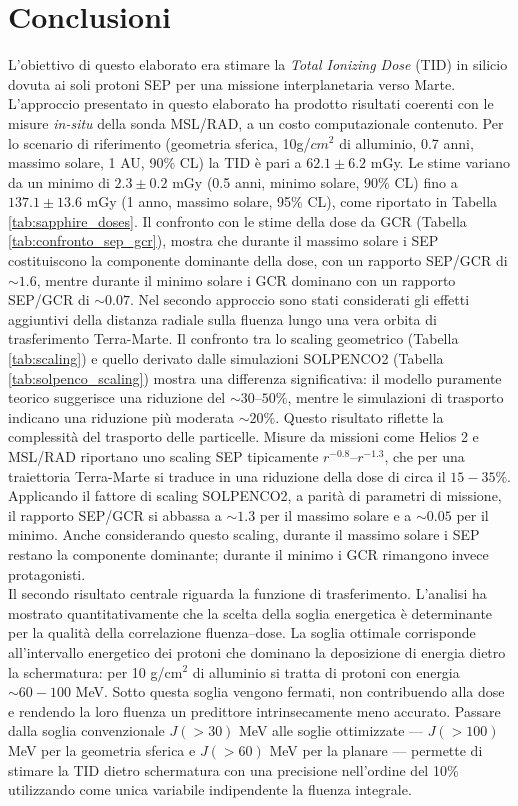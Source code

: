 \documentclass[12pt]{report}
\begin{document}
\chapter{Conclusioni}
\enlargethispage{3\baselineskip}
\vspace{-15pt}
L'obiettivo di questo elaborato era stimare la \textit{Total Ionizing Dose} (TID) in silicio dovuta ai soli protoni SEP per una missione interplanetaria verso Marte. L'approccio presentato in questo elaborato ha prodotto risultati coerenti con le misure \textit{in-situ} della sonda MSL/RAD, a un costo computazionale contenuto. Per lo scenario di riferimento (geometria sferica, 10g/$cm^2$ di alluminio, 0.7 anni, massimo solare, 1 AU, 90\% CL) la TID è pari a $62.1 \pm 6.2$ mGy. Le stime variano da un minimo di $2.3 \pm 0.2$ mGy (0.5 anni, minimo solare, 90\% CL) fino a $137.1 \pm 13.6$ mGy (1 anno, massimo solare, 95\% CL), come riportato in Tabella \ref{tab:sapphire_doses}. Il confronto con le stime della dose da GCR (Tabella \ref{tab:confronto_sep_gcr}), mostra che durante il massimo solare i SEP costituiscono la componente dominante della dose, con un rapporto SEP/GCR di $\sim 1.6$, mentre durante il minimo solare i GCR dominano con un rapporto SEP/GCR di $\sim 0.07$. Nel secondo approccio sono stati considerati gli effetti aggiuntivi della distanza radiale sulla fluenza lungo una vera orbita di trasferimento Terra-Marte. Il confronto tra lo scaling geometrico (Tabella \ref{tab:scaling}) e quello derivato dalle simulazioni SOLPENCO2 (Tabella \ref{tab:solpenco_scaling}) mostra una differenza significativa: il modello puramente teorico suggerisce una riduzione del $\sim 30$--$50\%$, mentre le simulazioni di trasporto indicano una riduzione più moderata $\sim 20\%$. Questo risultato riflette la complessità del trasporto delle particelle. Misure da missioni come Helios 2 \cite{Helios2_2023} e MSL/RAD \cite{Zeitlin2013} riportano uno scaling SEP tipicamente $r^{-0.8}$--$r^{-1.3}$, che per una traiettoria Terra-Marte si traduce in una riduzione della dose di circa il $15-35\%$. Applicando il fattore di scaling SOLPENCO2, a parità di parametri di missione, il rapporto SEP/GCR si abbassa a $\sim 1.3$ per il massimo solare e a $\sim0.05$ per il minimo. Anche considerando questo scaling, durante il massimo solare i SEP restano la componente dominante; durante il minimo i GCR rimangono invece protagonisti.\\
Il secondo risultato centrale riguarda la funzione di trasferimento. L'analisi ha mostrato quantitativamente che la scelta della soglia energetica è determinante per la qualità della correlazione fluenza--dose. La soglia ottimale corrisponde all'intervallo energetico dei protoni che dominano la deposizione di energia dietro la schermatura: per 10 g/cm$^2$ di alluminio si tratta di protoni con energia $\sim60-100$ MeV. Sotto questa soglia vengono fermati, non contribuendo alla dose e rendendo la loro fluenza un predittore intrinsecamente meno accurato. Passare dalla soglia convenzionale $J(>30)$ MeV alle soglie ottimizzate ---  $J(>100)$ MeV per la geometria sferica e $J(>60)$ MeV per la planare --- permette di stimare la TID dietro schermatura con una precisione nell'ordine del 10\% utilizzando come unica variabile indipendente la fluenza integrale. \\
\end{document}
